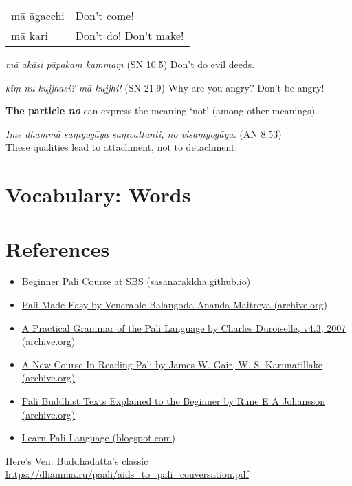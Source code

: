 \documentclass[11pt,oneside]{memoir}
\begin{document}
\begin{center}
\begin{tabular}{ll}
mā āgacchi & Don't come!\\[0pt]
mā kari & Don't do! Don't make!\\[0pt]
\end{tabular}
\end{center}

\emph{mā akāsi pāpakaṃ kammaṃ} (SN 10.5) Don’t do evil deeds.

\emph{kiṃ nu kujjhasi? mā kujjhi!} (SN 21.9) Why are you angry? Don't be angry!

\textbf{The particle \emph{no}} can express the meaning `not' (among other meanings).

\emph{Ime dhammā saṃyogāya saṃvattanti, no visaṃyogāya.} (AN 8.53) \\[0pt]
These qualities lead to attachment, not to detachment.

\chapter{Vocabulary: Words}
\label{sec:org25a1815}

\cleartonewsheet

\thispagestyle{empty}


\cleartonewsheet

\chapter{References}
\label{sec:orgc4a59f2}

\begin{itemize}
\item \href{https://sasanarakkha.github.io/study-tools/pali-class.html}{Beginner Pāli Course at SBS (sasanarakkha.github.io)}
\item \href{https://archive.org/details/PaliMadeEasyOCRed}{Pali Made Easy by Venerable Balangoda Ananda Maitreya (archive.org)}
\item \href{https://archive.org/details/PaliGrammarCharlesDuroiselle}{A Practical Grammar of the Pāli Language by Charles Duroiselle, v4.3, 2007 (archive.org)}
\item \href{https://archive.org/details/NewPaliCourse/}{A New Course In Reading Pali by James W. Gair, W. S. Karunatillake (archive.org)}
\item \href{https://archive.org/details/PaliBuddhistTextsA}{Pali Buddhist Texts Explained to the Beginner by Rune E A Johansson (archive.org)}
\item \href{https://palistudies.blogspot.com/}{Learn Pali Language (blogspot.com)}
\end{itemize}

Here's Ven. Buddhadatta's classic \url{https://dhamma.ru/paali/aids\_to\_pali\_conversation.pdf}
\end{document}
